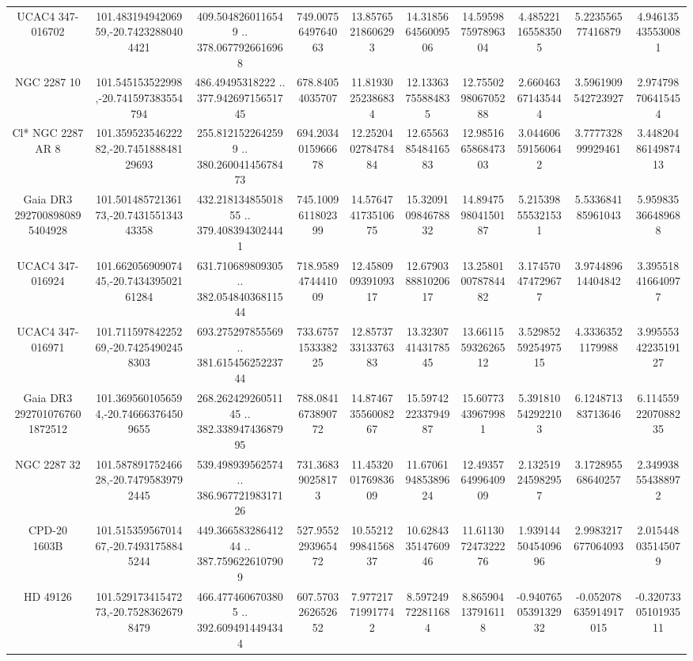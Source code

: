 \begin{table}
\begin{tabular}{cccccccccc}
UCAC4 347-016702 & 101.48319494206959,-20.74232880404421 & 409.5048260116549 .. 378.0677926616968 & 749.0075649764063 & 13.85765218606293 & 14.318566456009506 & 14.595987597896304 & 4.485221165583505 & 5.223556577416879 & 4.946135435530081 \\
NGC  2287    10 & 101.545153522998,-20.741597383554794 & 486.49495318222 .. 377.94269715651745 & 678.84054035707 & 11.81930252386834 & 12.13363755884835 & 12.755029806705288 & 2.660463671435444 & 3.5961909542723927 & 2.974798706415454 \\
Cl* NGC 2287     AR       8 & 101.35952354622282,-20.745188848129693 & 255.8121522642599 .. 380.26004145678473 & 694.2034015966678 & 12.252040278478484 & 12.655638548416583 & 12.985166586847303 & 3.044606591560642 & 3.777732899929461 & 3.4482048614987413 \\
Gaia DR3 2927008980895404928 & 101.50148572136173,-20.743155134343358 & 432.21813485501855 .. 379.4083943024441 & 745.1009611802399 & 14.576474173510675 & 15.320910984678832 & 14.894759804150187 & 5.215398555321531 & 5.533684185961043 & 5.959835366489688 \\
UCAC4 347-016924 & 101.66205690907445,-20.743439502161284 & 631.710689809305 .. 382.05484036811544 & 718.9589474441009 & 12.458090939109317 & 12.679038881020617 & 13.258010078784482 & 3.174570474729677 & 3.974489614404842 & 3.395518416640977 \\
UCAC4 347-016971 & 101.71159784225269,-20.74254902458303 & 693.275297855569 .. 381.61545625223744 & 733.6757153338225 & 12.857373313376383 & 13.323074143178545 & 13.661155932626512 & 3.5298525925497515 & 4.33363521179988 & 3.9955534223519127 \\
Gaia DR3 2927010767601872512 & 101.3695601056594,-20.746663764509655 & 268.26242926051145 .. 382.33894743687995 & 788.0841673890772 & 14.874673556008267 & 15.597422233794987 & 15.60773439679981 & 5.391810542922103 & 6.124871383713646 & 6.1145592207088235 \\
NGC  2287    32 & 101.58789175246628,-20.74795839792445 & 539.498939562574 .. 386.96772198317126 & 731.368390258173 & 11.453200176983609 & 11.670619485389624 & 12.493576499640909 & 2.132519245982957 & 3.172895568640257 & 2.349938554388972 \\
CPD-20  1603B & 101.51535956701467,-20.74931758845244 & 449.36658328641244 .. 387.7596226107909 & 527.9552293965472 & 10.552129984156837 & 10.628433514760946 & 11.611307247322276 & 1.9391445045409696 & 2.9983217677064093 & 2.015448035145079 \\
HD  49126 & 101.52917341547273,-20.75283626798479 & 466.4774606703805 .. 392.6094914494344 & 607.5703262652652 & 7.977217719917742 & 8.597249722811684 & 8.865904137916118 & -0.9407650539132932 & -0.052078635914917015 & -0.3207330510193511 \\

\end{tabular}
\end{table}
